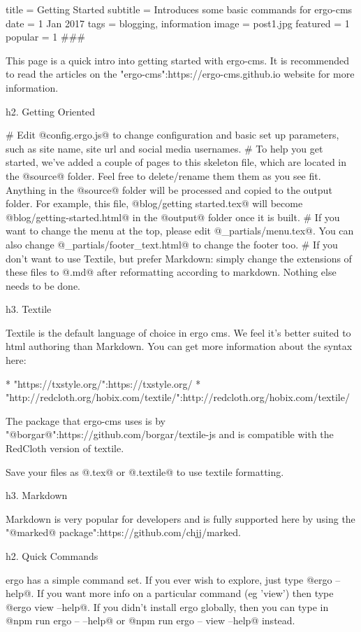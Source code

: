 title = Getting Started
subtitle = Introduces some basic commands for ergo-cms
date = 1 Jan 2017
tags = blogging, information
image = post1.jpg
featured = 1
popular = 1
###

This page is a quick intro into getting started with ergo-cms. It is recommended to read the articles on the "ergo-cms":https://ergo-cms.github.io website for more information.

h2. Getting Oriented

# Edit @config.ergo.js@ to change configuration and basic set up parameters, such as site name, site url and social media usernames.
# To help you get started, we've added a couple of pages to this skeleton file, which are located in the @source@ folder. Feel free to delete/rename them them as you see fit. 
Anything in the @source@ folder will be processed and copied to the output folder. For example, this file, @blog/getting started.tex@ will become @blog/getting-started.html@ in the @output@ folder once it is built.
# If you want to change the menu at the top, please edit @_partials/menu.tex@. You can also change @_partials/footer_text.html@ to change the footer too.
# If you don't want to use Textile, but prefer Markdown: simply change the extensions of these files to @.md@ after reformatting according to markdown. Nothing else needs to be done. 

h3. Textile

Textile is the default language of choice in ergo cms. We feel it's better suited to html authoring than Markdown. You can get more information about the syntax here:

* "https://txstyle.org/":https://txstyle.org/
* "http://redcloth.org/hobix.com/textile/":http://redcloth.org/hobix.com/textile/

The package that ergo-cms uses is by "@borgar@":https://github.com/borgar/textile-js and is compatible with the RedCloth version of textile.

Save your files as @.tex@ or @.textile@ to use textile formatting. 

h3. Markdown

Markdown is very popular for developers and is fully supported here by using the "@marked@ package":https://github.com/chjj/marked.

h2. Quick Commands

ergo has a simple command set. If you ever wish to explore, just type @ergo --help@. If you want more info on a particular command (eg 'view') then type @ergo view --help@. If you didn't install ergo globally, then you can type in @npm run ergo -- --help@ or @npm run ergo -- view --help@ instead.

